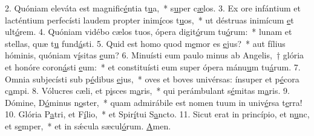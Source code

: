 2. Quóniam eleváta est magnific\uline{é}ntia t\uline{u}a,~* s\uline{u}per c\uline{æ}los.
3. Ex ore infántium et lacténtium perfecísti laudem propter inim\uline{í}cos t\uline{u}os,~* ut déstruas inimícum \uline{e}t ult\uline{ó}rem.
4. Quóniam vidébo cælos tuos, ópera digit\uline{ó}rum tu\uline{ó}rum:~* lunam et stellas, quæ t\uline{u} fund\uline{á}sti.
5. Quid est homo quod m\uline{e}mor es \uline{e}jus?~* aut fílius hóminis, quóniam v\uline{í}sitas \uline{e}um?
6. Minuísti eum paulo minus ab Angelis,~† glória et honóre coron\uline{á}sti \uline{e}um:~* et constituísti eum super ópera mánu\uline{u}m tu\uline{á}rum.
7. Omnia subjecísti sub p\uline{é}dibus \uline{e}jus,~* oves et boves univérsas: ínsuper et p\uline{é}cora c\uline{a}mpi.
8. Vólucres cæli, et p\uline{i}sces m\uline{a}ris,~* qui perámbulant s\uline{é}mitas m\uline{a}ris.
9. Dómine, D\uline{ó}minus n\uline{o}ster,~* quam admirábile est nomen tuum in univ\uline{é}rsa t\uline{e}rra!
10. Glória P\uline{a}tri, et F\uline{í}lio,~* et Spir\uline{í}tui S\uline{a}ncto.
11. Sicut erat in princípio, et n\uline{u}nc, et s\uline{e}mper,~* et in sǽcula sæcul\uline{ó}rum. \uline{A}men.
